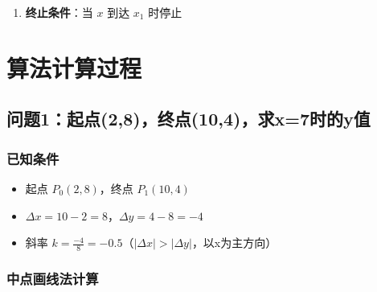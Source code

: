 \documentclass[12pt,a4paper]{article}
\begin{document}
\begin{tcolorbox}
\begin{enumerate}
    \item \textbf{终止条件}：当 $x$ 到达 $x_1$ 时停止
\end{enumerate}

\end{tcolorbox}

\section{算法计算过程}

\subsection{问题1：起点(2,8)，终点(10,4)，求x=7时的y值}

\subsubsection{已知条件}

\begin{tcolorbox}
\begin{itemize}
    \item 起点 $P_0(2, 8)$，终点 $P_1(10, 4)$
    \item $\Delta x = 10 - 2 = 8$，$\Delta y = 4 - 8 = -4$
    \item 斜率 $k = \frac{-4}{8} = -0.5$（$|\Delta x| > |\Delta y|$，以x为主方向）
\end{itemize}
\end{tcolorbox}

\subsubsection{中点画线法计算}
\end{document}
